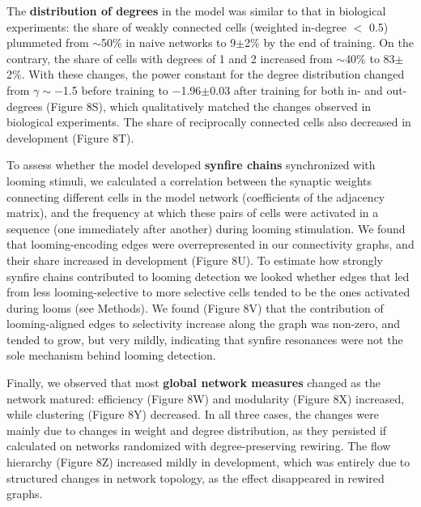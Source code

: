 \documentclass{article}
\providecommand{\DIFaddtex}[1]{{\protect\color{blue}{#1}}} %
\providecommand{\DIFaddbegin}{} %
\providecommand{\DIFaddend}{} %
\providecommand{\DIFadd}[1]{\texorpdfstring{\DIFaddtex{#1}}{#1}} %
\newcommand{\DIFaddincludegraphics}[2][]{{\color{blue}\fbox{\DIFOincludegraphics[#1]{#2}}}} %
\DeclareRobustCommand{\DIFaddbegin}{\DIFOaddbegin \let\includegraphics\DIFaddincludegraphics} %
\DeclareRobustCommand{\DIFaddend}{\DIFOaddend \let\includegraphics\DIFOincludegraphics} %
\begin{document}
The \textbf{distribution of degrees} in the model was similar to that in biological experiments: the share of weakly connected cells (weighted in-degree $<$ 0.5) plummeted from $\sim$50\% in naive networks to 9$\pm$2\% by the end of training. On the contrary, the share of cells with degrees of 1 and 2 increased from $\sim$40\% to 83$\pm$2\%. With these changes, the power constant for the degree distribution changed from $\gamma \sim -$1.5 before training to $-$1.96$\pm$0.03 after training for both in- and out-degrees (Figure 8S), which qualitatively matched the changes observed in biological experiments. The share of reciprocally connected cells also decreased in development (Figure 8T).

To assess whether the model developed \textbf{synfire chains} synchronized with looming stimuli, we calculated a correlation between the synaptic weights connecting different cells in the model network (coefficients of the adjacency matrix), and the frequency at which these pairs of cells were activated in a sequence (one immediately after another) during looming stimulation. We found that looming-encoding edges were overrepresented in our connectivity graphs, and their share increased in development (Figure 8U). To estimate how strongly synfire chains contributed to looming detection we looked \DIFaddbegin \DIFadd{at }\DIFaddend whether edges that led from less looming-selective to more selective cells tended to be the ones activated during looms (see Methods). We found (Figure 8V) that the contribution of looming-aligned edges to selectivity increase along the graph was non-zero, and tended to grow, but very mildly, indicating that synfire resonances were not the sole mechanism behind looming detection.

Finally, we observed that most \textbf{global network measures} changed as the network matured: efficiency (Figure 8W) and modularity (Figure 8X) increased, while clustering (Figure 8Y) decreased. In all three cases, the changes were mainly due to changes in weight and degree distribution, as they persisted if calculated on networks randomized with degree-preserving rewiring. The flow hierarchy (Figure 8Z) increased mildly in development, which was entirely due to structured changes in network topology, as the effect disappeared in rewired graphs.
\end{document}
